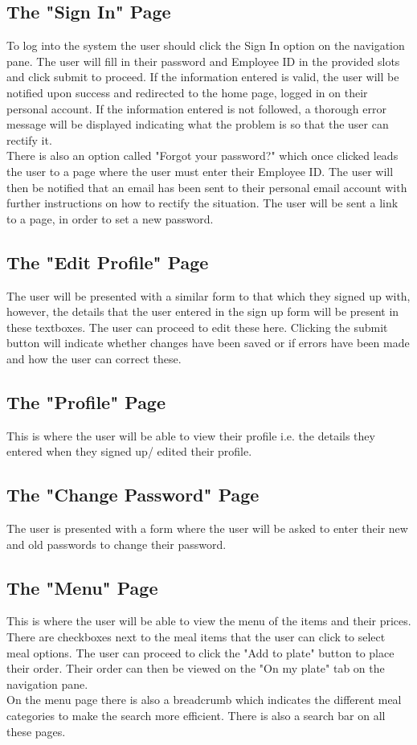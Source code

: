 \documentclass[12pt]{article}
\begin{document}
\subsection{The "Sign In" Page} 
To log into the system the user should click the Sign In option on the navigation pane. The user will fill in their password and Employee ID in the provided slots and click submit to proceed. If the information entered is valid, the user will be notified upon success and redirected to the home page, logged in on their personal account. If the information entered is not followed, a thorough error message will be displayed indicating what the problem is so that the user can rectify it.
\\
There is also an option called "Forgot your password?" which once clicked leads the user to a page where the user must enter their Employee ID. The user will then be notified that an email has been sent to their personal email account with further instructions on how to rectify the situation. The user will be sent a link to a page, in order to set a new password.   

\subsection{The "Edit Profile" Page} 
The user will be presented with a similar form to that which they signed up with, however, the details that the user entered in the sign up form will be present in these textboxes. The user can proceed to edit these here. Clicking the submit button will indicate whether changes have been saved or if errors have been made and how the user can correct these.

\subsection{The "Profile" Page} 
This is where the user will be able to view their profile i.e. the details they entered when they signed up/ edited their profile. 

\subsection{The "Change Password" Page} 
The user is presented with a form where the user will be asked to enter their new and old passwords to change their password. 

\subsection{The "Menu" Page} 
This is where the user will be able to view the menu of the items and their prices. There are checkboxes next to the meal items that the user can click to select meal options. The user can proceed to click the "Add to plate" button to place their order. Their order can then be viewed on the "On my plate" tab on the navigation pane. 
\\
On the menu page there is also a breadcrumb which indicates the different meal categories to make the search more efficient. There is also a search bar on all these pages. 
\end{document}
